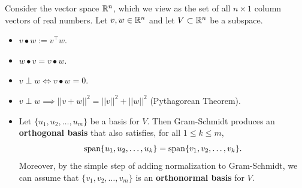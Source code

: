 \begin{tcolorbox}[title=\Large \textbf{Review}]
Consider the vector space $\mathbb R^n$, which we view as the set of all $n \times 1$ column vectors of real numbers. Let $v, w \in \mathbb R^n$ and let $V\subset \mathbb R^n$ be a subspace.
\begin{itemize}
    \item  $v \bullet w := v^\top w$.
    \item  $w\bullet v = v \bullet w$.
    \item $v \perp w \iff v \bullet w = 0$.
    \item $v \perp w \implies ||v + w||^2 = ||v||^2 + ||w||^2$ (Pythagorean Theorem).
    \item Let $\{u_1, u_2, \ldots, u_m\}$ be a basis for $V$. Then Gram-Schmidt produces an \textbf{orthogonal basis} that also satisfies, for all $1\le k \le m$,
    $$ \mathrm{span} \{ u_1, u_2, \ldots, u_k \} = \mathrm{span} \{ v_1, v_2, \ldots, v_k \}.$$
    Moreover, by the simple step of adding normalization to Gram-Schmidt, we can assume that $\{v_1, v_2, \ldots, v_m\}$ is an \textbf{orthonormal basis} for $V$.
\end{itemize}
\end{tcolorbox}




